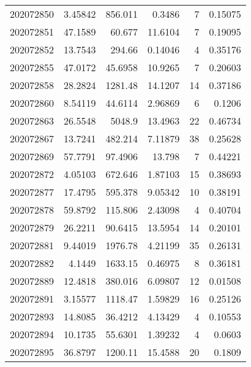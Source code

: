 \begin{tabular}{rrrrrr}
 202072850 &          3.45842 &      856.011  &            0.3486  &           7 & 0.15075 \\
 202072851 &         47.1589  &       60.677  &           11.6104  &           7 & 0.19095 \\
 202072852 &         13.7543  &      294.66   &            0.14046 &           4 & 0.35176 \\
 202072855 &         47.0172  &       45.6958 &           10.9265  &           7 & 0.20603 \\
 202072858 &         28.2824  &     1281.48   &           14.1207  &          14 & 0.37186 \\
 202072860 &          8.54119 &       44.6114 &            2.96869 &           6 & 0.1206  \\
 202072863 &         26.5548  &     5048.9    &           13.4963  &          22 & 0.46734 \\
 202072867 &         13.7241  &      482.214  &            7.11879 &          38 & 0.25628 \\
 202072869 &         57.7791  &       97.4906 &           13.798   &           7 & 0.44221 \\
 202072872 &          4.05103 &      672.646  &            1.87103 &          15 & 0.38693 \\
 202072877 &         17.4795  &      595.378  &            9.05342 &          10 & 0.38191 \\
 202072878 &         59.8792  &      115.806  &            2.43098 &           4 & 0.40704 \\
 202072879 &         26.2211  &       90.6415 &           13.5954  &          14 & 0.20101 \\
 202072881 &          9.44019 &     1976.78   &            4.21199 &          35 & 0.26131 \\
 202072882 &          4.1449  &     1633.15   &            0.46975 &           8 & 0.36181 \\
 202072889 &         12.4818  &      380.016  &            6.09807 &          12 & 0.01508 \\
 202072891 &          3.15577 &     1118.47   &            1.59829 &          16 & 0.25126 \\
 202072893 &         14.8085  &       36.4212 &            4.13429 &           4 & 0.10553 \\
 202072894 &         10.1735  &       55.6301 &            1.39232 &           4 & 0.0603  \\
 202072895 &         36.8797  &     1200.11   &           15.4588  &          20 & 0.1809  \\

\end{tabular}
